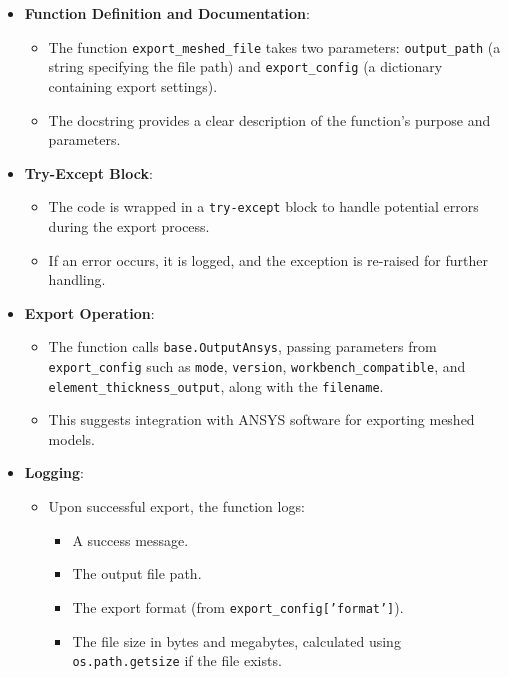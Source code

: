 \documentclass{book}
\begin{document}
\begin{itemize}[leftmargin=*,label=\textbullet]
\begin{itemize}
    \item \textbf{Function Definition and Documentation}:
    \begin{itemize}
        \item The function \texttt{export\_meshed\_file} takes two parameters: \texttt{output\_path} (a string specifying the file path) and \texttt{export\_config} (a dictionary containing export settings).
        \item The docstring provides a clear description of the function's purpose and parameters.
    \end{itemize}
    \item \textbf{Try-Except Block}:
    \begin{itemize}
        \item The code is wrapped in a \texttt{try-except} block to handle potential errors during the export process.
        \item If an error occurs, it is logged, and the exception is re-raised for further handling.
    \end{itemize}
    \item \textbf{Export Operation}:
    \begin{itemize}
        \item The function calls \texttt{base.OutputAnsys}, passing parameters from \texttt{export\_config} such as \texttt{mode}, \texttt{version}, \texttt{workbench\_compatible}, and \texttt{element\_thickness\_output}, along with the \texttt{filename}.
        \item This suggests integration with ANSYS software for exporting meshed models.
    \end{itemize}
    \item \textbf{Logging}:
    \begin{itemize}
        \item Upon successful export, the function logs:
        \begin{itemize}
            \item A success message.
            \item The output file path.
            \item The export format (from \texttt{export\_config['format']}).
            \item The file size in bytes and megabytes, calculated using \texttt{os.path.getsize} if the file exists.
        \end{itemize}
    \end{itemize}

\end{itemize}
\end{itemize}
\end{document}
